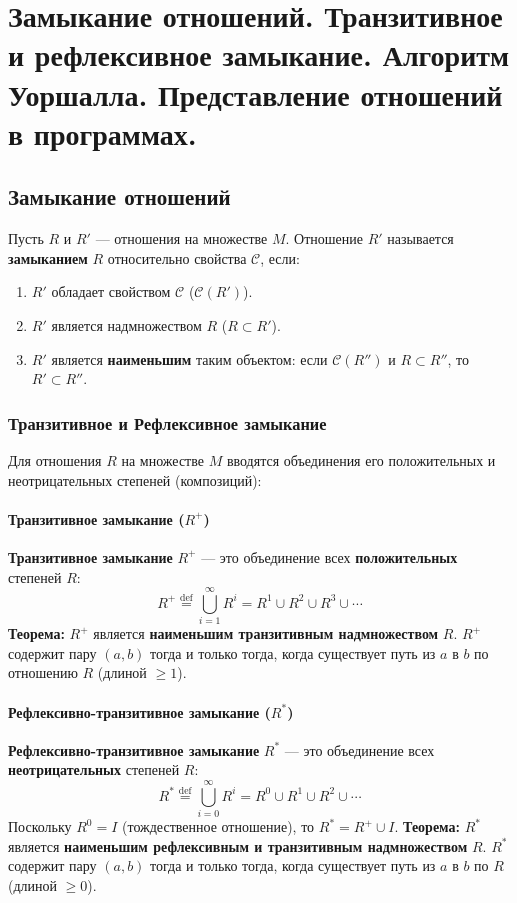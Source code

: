 \section{Замыкание отношений. Транзитивное и рефлексивное замыкание. Алгоритм Уоршалла. Представление отношений в программах.}

\subsection*{Замыкание отношений}

Пусть $R$ и $R'$ --- отношения на множестве $M$. Отношение $R'$ называется \textbf{замыканием} $R$ относительно свойства $\mathcal{C}$, если:
\begin{enumerate}
    \item $R'$ обладает свойством $\mathcal{C}$ ($\mathcal{C}(R')$).
    \item $R'$ является надмножеством $R$ ($R \subset R'$).
    \item $R'$ является \textbf{наименьшим} таким объектом: если $\mathcal{C}(R'')$ и $R \subset R''$, то $R' \subset R''$.
\end{enumerate}

\subsubsection*{Транзитивное и Рефлексивное замыкание}

Для отношения $R$ на множестве $M$ вводятся объединения его положительных и неотрицательных степеней (композиций):

\paragraph{Транзитивное замыкание ($R^+$)}
\textbf{Транзитивное замыкание} $R^+$ --- это объединение всех \textbf{положительных} степеней $R$:
$$R^+ \stackrel{\text{def}}{=} \bigcup_{i=1}^\infty R^i = R^1 \cup R^2 \cup R^3 \cup \cdots$$
\textbf{Теорема:} $R^+$ является \textbf{наименьшим транзитивным надмножеством} $R$. $R^+$ содержит пару $(a, b)$ тогда и только тогда, когда существует путь из $a$ в $b$ по отношению $R$ (длиной $\ge 1$).

\paragraph{Рефлексивно-транзитивное замыкание ($R^*$)}
\textbf{Рефлексивно-транзитивное замыкание} $R^*$ --- это объединение всех \textbf{неотрицательных} степеней $R$:
$$R^* \stackrel{\text{def}}{=} \bigcup_{i=0}^\infty R^i = R^0 \cup R^1 \cup R^2 \cup \cdots$$
Поскольку $R^0 = I$ (тождественное отношение), то $R^* = R^+ \cup I$.
\textbf{Теорема:} $R^*$ является \textbf{наименьшим рефлексивным и транзитивным надмножеством} $R$. $R^*$ содержит пару $(a, b)$ тогда и только тогда, когда существует путь из $a$ в $b$ по $R$ (длиной $\ge 0$).

